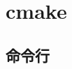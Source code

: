 \documentclass{../main.tex}{subfiles}
\begin{document}
\chapter{cmake}
\section{命令行}

\end{document}
